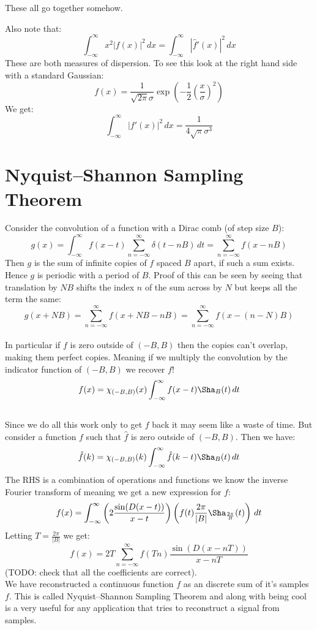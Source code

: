 These all go together somehow.

Also note that:
\[\int_{-\infty}^{\infty}x^2|f(x)|^2\,dx = \int_{-\infty}^{\infty}|\hat{f}'(x)|^2\,dx\]
These are both measures of dispersion.
To see this look at the right hand side with a standard Gaussian:
\[f(x) = \frac{1}{\sqrt{2\pi}\sigma}\exp\left(-\frac{1}{2}\left(\frac{x}{\sigma}\right)^2 \right)\]
We get:
\[\int_{-\infty}^{\infty}|f'(x)|^2\,dx = \frac{1}{4\sqrt{\pi}\sigma^3} \]

\section{Nyquist–Shannon Sampling Theorem}
Consider the convolution of a function with a Dirac comb (of step size $B$):
\[g(x) = \int_{-\infty}^{\infty}f(x-t)\sum_{n=-\infty}^{\infty}\delta(t-nB)\,dt = \sum_{n=-\infty}^{\infty}f(x-nB)\]
Then $g$ is the sum of infinite copies of $f$ spaced $B$ apart, if such a sum exists.
Hence $g$ is periodic with a period of $B$. 
Proof of this can be seen by seeing that translation by $NB$ shifts the index $n$ of the sum across by $N$ but keeps all the term the same:
\[g(x+NB) = \sum_{n=-\infty}^{\infty}f(x+NB-nB) = \sum_{n=-\infty}^{\infty}f(x-(n-N)B) \]
\\

In particular if $f$ is zero outside of $(-B,B)$ then the copies can't overlap, making them perfect copies.
Meaning if we multiply the convolution by the indicator function of $(-B,B)$ we recover $f$!
\[f(x) = \chi_{(-B,B)}(x)\int_{-\infty}^{\infty}f(x-t)\Sha_B(t)\,dt\]
\\

Since we do all this work only to get $f$ back it may seem like a waste of time.
But consider a function $f$ such that $\hat{f}$ is zero outside of $(-B,B)$.
Then we have:
\[\hat{f}(k) = \chi_{(-B,B)}(k)\int_{-\infty}^{\infty}\hat{f}(k-t)\Sha_B(t)\,dt\]
The RHS is a combination of operations and functions we know the inverse Fourier transform of meaning we get a new expression for $f$:
\[f(x) = \int_{-\infty}^{\infty}\left(2\frac{\sin(D(x-t))}{x-t}\right)\left(f(t)\frac{2\pi}{|B|}\Sha_{\frac{2\pi}{B}}(t)\right)\,dt \]
Letting $T = \frac{2\pi}{|B|}$ we get:
\[ f(x) = 2T\sum_{n=-\infty}^{\infty}f(Tn)\frac{\sin(D(x-nT))}{x-nT} \]
(TODO: check that all the coefficients are correct).
\\

We have reconstructed a continuous function $f$ as an discrete sum of it's samples $f$.
This is called Nyquist–Shannon Sampling Theorem and along with being cool is a very useful for any application that tries to reconstruct a signal from samples.

